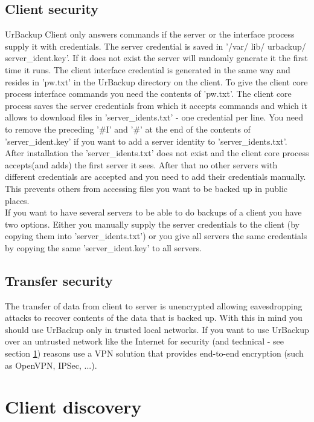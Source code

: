 \documentclass[a4paper,10pt]{article}
\begin{document}
\subsection{Client security}

UrBackup Client only answers commands if the server or the interface process supply it with credentials. The server credential is saved in '/var/ lib/ urbackup/ server\_ident.key'. If it does not exist the server will randomly generate it the first time it runs. The client interface credential is generated in the same way and resides in 'pw.txt' in the UrBackup directory on the client. To give the client core process interface commands you need the contents of 'pw.txt'. The client core process saves the server credentials from which it accepts commands and which it allows to download files in 'server\_idents.txt' - one credential per line. You need to remove the preceding '\#I' and '\#' at the end of the contents of 'server\_ident.key' if you want to add a server identity to 'server\_idents.txt'. After installation the 'server\_idents.txt' does not exist and the client core process accepts(and adds) the first server it sees. After that no other servers with different credentials are accepted and you need to add their credentials manually. This prevents others from accessing files you want to be backed up in public places.\\
If you want to have several servers to be able to do backups of a client you have two options. Either you manually supply the server credentials to the client (by copying them into 'server\_idents.txt') or you give all servers the same credentials by copying the same 'server\_ident.key' to all servers.

\subsection{Transfer security}

The transfer of data from client to server is unencrypted allowing eavesdropping attacks to recover contents of the data that is backed up. With this in mind you should use UrBackup only in trusted local networks. If you want to use UrBackup over an untrusted network like the Internet for security (and technical - see section \ref{client_discovery}) reasons use a VPN solution that provides end-to-end encryption (such as OpenVPN, IPSec, ...).


\section{Client discovery}
\label{client_discovery}
\end{document}
